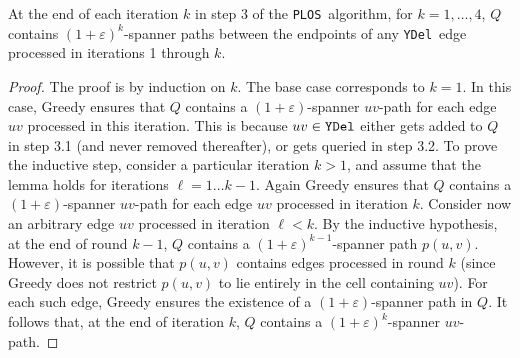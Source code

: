 \documentclass{llncs}
\newcommand{\ABox}{
\raisebox{3pt}{\framebox[6pt]{\rule{6pt}{0pt}}}
}
\newcommand{\e}{\varepsilon}
\newcommand{\palg}{{\tt PLOS}}
\newcommand{\ydel}{{\tt YDel}}
\begin{document}
\begin{lemma}
At the end of each iteration $k$ in step 3 of the \palg\ algorithm,
for $k = 1, \ldots, 4$, $Q$ contains $(1+\e)^k$-spanner paths between
the endpoints of any \ydel\ edge processed in iterations 1 through $k$.
\label{lem:step3greedy}
\end{lemma}
\begin{proof}
The proof is by induction on $k$. The base case corresponds to $k=1$.
In this case, Greedy ensures that $Q$ contains a $(1+\e)$-spanner $uv$-path for
each edge $uv$ processed in this iteration. This is because $uv \in \ydel$
either gets added to $Q$ in step 3.1 (and never removed thereafter),
or gets queried in step 3.2. To prove the inductive step, consider
a particular iteration $k > 1$, and assume that the lemma holds for iterations
$\ell = 1 \ldots k-1$.
Again Greedy ensures that $Q$ contains a $(1+\e)$-spanner $uv$-path for
each edge $uv$ processed in iteration $k$. Consider now an arbitrary edge
$uv$ processed in iteration $\ell < k$. By the inductive hypothesis, at
the end of round $k-1$, $Q$ contains a $(1+\e)^{k-1}$-spanner path $p(u,v)$.
However, it is possible that $p(u,v)$ contains edges processed in round
$k$ (since Greedy does not restrict $p(u,v)$ to lie entirely in the
cell containing $uv$). For each such edge, Greedy ensures the existence
of a $(1+\e)$-spanner path in $Q$. It follows that, at the end of iteration
$k$, $Q$ contains a $(1+\e)^k$-spanner $uv$-path. \hfill\ABox
\end{proof}
\end{document}

